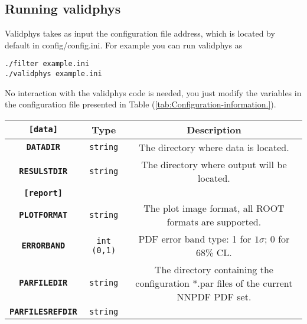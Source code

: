 \subsection{Running validphys}

Validphys takes as input the configuration file address, which is
located by default in config/config.ini. For example you can run validphys
as

\begin{lstlisting}
./filter example.ini
./validphys example.ini
\end{lstlisting}


No interaction with the validphys code is needed, you just modify
the variables in the configuration file presented in Table (\ref{tab:Configuration-information.}).

\begin{table}[H]
\begin{centering}
\begin{tabular}{|c|c|c|}
\hline 
\multicolumn{1}{|c}{\texttt{\textbf{{[}data{]}}}} & \multicolumn{1}{c}{Type} & Description\tabularnewline
\hline 
\hline 
\texttt{\textbf{DATADIR}} & \texttt{string} & %
\begin{minipage}[t]{0.5\columnwidth}%
The directory where data is located.%
\end{minipage}\tabularnewline
\hline 
\texttt{\textbf{RESULSTDIR}} & \texttt{string} & %
\begin{minipage}[t]{0.5\columnwidth}%
The directory where output will be located.%
\end{minipage}\tabularnewline
\hline 
\hline 
\multicolumn{1}{|c}{\texttt{\textbf{{[}report{]}}}} & \multicolumn{1}{c}{} & \tabularnewline
\hline 
\hline 
\texttt{\textbf{PLOTFORMAT}} & \texttt{string} & %
\begin{minipage}[t]{0.5\columnwidth}%
The plot image format, all ROOT formats are supported.%
\end{minipage}\tabularnewline
\hline 
\texttt{\textbf{ERRORBAND}} & \texttt{int (0,1)} & %
\begin{minipage}[t]{0.5\columnwidth}%
PDF error band type: 1 for $1\sigma$; 0 for 68\% CL.%
\end{minipage}\tabularnewline
\hline 
\texttt{\textbf{PARFILEDIR}} & \texttt{string} & %
\begin{minipage}[t]{0.5\columnwidth}%
The directory containing the configuration {*}.par files of the current
NNPDF PDF set.%
\end{minipage}\tabularnewline
\hline 
\texttt{\textbf{PARFILESREFDIR}} & \texttt{string} & %

\end{tabular}
\end{centering}
\end{table}
